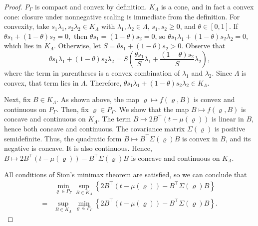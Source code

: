 \documentclass[12pt,leqno,titlepage]{amsart}
\newcommand{\1}{\mathbbm{1}}
\begin{document}
\begin{bibunit}
\begin{proof}
$P_\Gamma$ is compact and convex by definition. $K_\Lambda$ is a cone, and in fact a convex cone: closure under nonnegative scaling is immediate from the definition. For convexity, take $s_1\lambda_1, s_2\lambda_2 \in K_\Lambda$ with $\lambda_1,\lambda_2 \in \Lambda$, $s_1,s_2 \ge 0$, and $\theta \in [0,1]$. If
$
\theta s_1 + (1-\theta)s_2 = 0,
$
then $\theta s_1 = (1-\theta)s_2 = 0$, so
$
\theta s_1 \lambda_1 + (1-\theta)s_2 \lambda_2 = 0,
$
which lies in $K_\Lambda$. Otherwise, let
$
S = \theta s_1 + (1-\theta)s_2 > 0.
$
Observe that
\[
\theta s_1 \lambda_1 + (1-\theta)s_2 \lambda_2
=
S\left(\frac{\theta s_1}{S}\lambda_1 + \frac{(1-\theta)s_2}{S}\lambda_2\right),
\]
where the term in parentheses is a convex combination of $\lambda_1$ and $\lambda_2$. Since $\Lambda$ is convex, that term lies in $\Lambda$. Therefore,
$
\theta s_1 \lambda_1 + (1-\theta)s_2 \lambda_2 \in K_\Lambda.
$

Next, fix $B\in K_\Lambda$. As shown above, the map $\varrho\mapsto f(\varrho,B)$ is convex and continuous on $P_\Gamma$. Then, fix $\varrho\in P_\Gamma$. We show that the map $B\mapsto f(\varrho,B)$ is concave and continuous on $K_\Lambda$. The term $B\mapsto 2B^\top(t-\mu(\varrho))$ is linear in $B$, hence both concave and continuous. The covariance matrix $\Sigma(\varrho)$ is positive semidefinite. Thus, the quadratic form $B\mapsto B^\top\Sigma(\varrho)B$ is convex in $B$, and its negative is concave. It is also continuous. Hence,
$
B\longmapsto 2B^\top(t-\mu(\varrho))-B^\top\Sigma(\varrho)B
$
is concave and continuous on $K_\Lambda$.

All conditions of Sion's minimax theorem are satisfied, so we can conclude that
\begin{align*}
&\min_{\varrho\in P_\Gamma}\sup_{B\in K_\Lambda}
\left\{
2B^\top(t-\mu(\varrho))-B^\top\Sigma(\varrho)B
\right\}\\
=
&\sup_{B\in K_\Lambda}\min_{\varrho\in P_\Gamma}
\left\{
2B^\top(t-\mu(\varrho))-B^\top\Sigma(\varrho)B
\right\}.
\end{align*}


\end{proof}
\end{bibunit}
\end{document}
